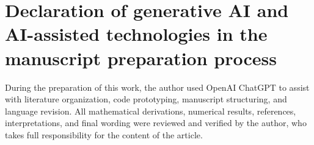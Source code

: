 \documentclass[preprint,12pt]{elsarticle}
\theoremstyle{remark}
\begin{document}
\section*{Declaration of generative AI and AI-assisted technologies in
the manuscript preparation process}

During the preparation of this work, the author used OpenAI ChatGPT to
assist with literature organization, code prototyping, manuscript
structuring, and language revision. All mathematical derivations,
numerical results, references, interpretations, and final wording were
reviewed and verified by the author, who takes full responsibility for
the content of the article.



\end{document}
